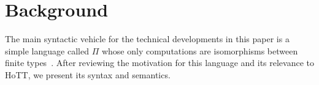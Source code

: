 \section{Background}

The main syntactic vehicle for the technical developments in this paper is a
simple language called $\Pi$ whose only computations are isomorphisms between
finite types~\cite{James:2012:IE:2103656.2103667}. After reviewing the
motivation for this language and its relevance to HoTT, we present its syntax
and semantics.

